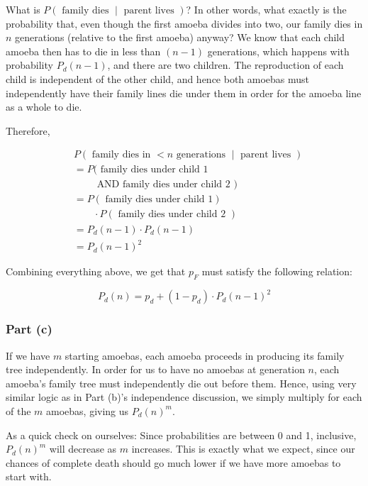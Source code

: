What is $P\left(\text{ family dies } \middle| \text{ parent lives }\right)$? In other words, what exactly is the probability that, even though the first amoeba divides into two, our family dies in $n$ generations (relative to the first amoeba) anyway? We know that each child amoeba then has to die in less than $(n-1)$ generations, which happens with probability $P_d(n-1)$, and there are two children. The reproduction of each child is independent of the other child, and hence both amoebas must independently have their family lines die under them in order for the amoeba line as a whole to die.

Therefore, 

\begin{align*}
&P\left(\text{ family dies in $<n$ generations } \middle| \text{ parent lives }\right) \\
&= P(\text{ family dies under child 1} \\
&\qquad\text{ AND family dies under child 2 }) \\
&= P\left(\text{ family dies under child 1} \right) \\ 
&\qquad\cdot P\left(\text{ family dies under child 2 } \right) \\
&= P_d(n-1) \cdot P_d(n-1) \\
&= P_d(n-1)^2
\end{align*}


Combining everything above, we get that $p_F$ must satisfy the following relation:

\begin{equation}
P_d(n) = p_d + (1-p_d) \cdot P_d(n-1)^2
\end{equation}


\subsubsection{Part (c)}

If we have $m$ starting amoebas, each amoeba proceeds in producing its family tree independently. In order for us to have no amoebas at generation $n$, each amoeba's family tree must independently die out before them. Hence, using very similar logic as in Part (b)'s independence discussion, we simply multiply for each of the $m$ amoebas, giving us $P_d(n)^m$. 

As a quick check on ourselves: Since probabilities are between 0 and 1, inclusive, $P_d(n)^m$ will decrease as $m$ increases. This is exactly what we expect, since our chances of complete death should go much lower if we have more amoebas to start with.

